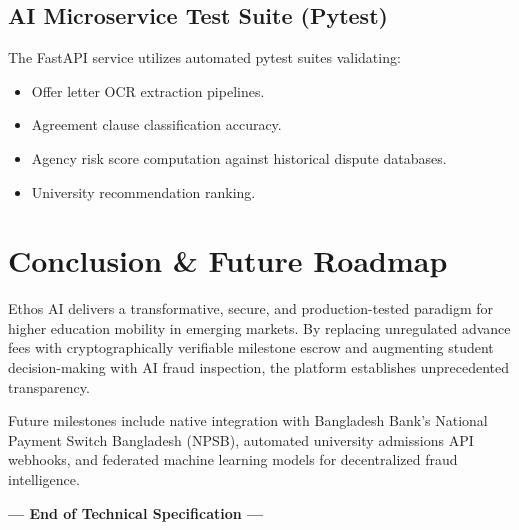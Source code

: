 \documentclass[11pt,a4paper]{article}
\begin{document}
\subsection{AI Microservice Test Suite (Pytest)}
The FastAPI service utilizes automated pytest suites validating:
\begin{itemize}
    \item Offer letter OCR extraction pipelines.
    \item Agreement clause classification accuracy.
    \item Agency risk score computation against historical dispute databases.
    \item University recommendation ranking.
\end{itemize}

\section{Conclusion \& Future Roadmap}

Ethos AI delivers a transformative, secure, and production-tested paradigm for higher education mobility in emerging markets. By replacing unregulated advance fees with cryptographically verifiable milestone escrow and augmenting student decision-making with AI fraud inspection, the platform establishes unprecedented transparency. 

Future milestones include native integration with Bangladesh Bank's National Payment Switch Bangladesh (NPSB), automated university admissions API webhooks, and federated machine learning models for decentralized fraud intelligence.

\vspace{0.8cm}
\begin{center}
\textbf{--- End of Technical Specification ---}
\end{center}
\end{document}
